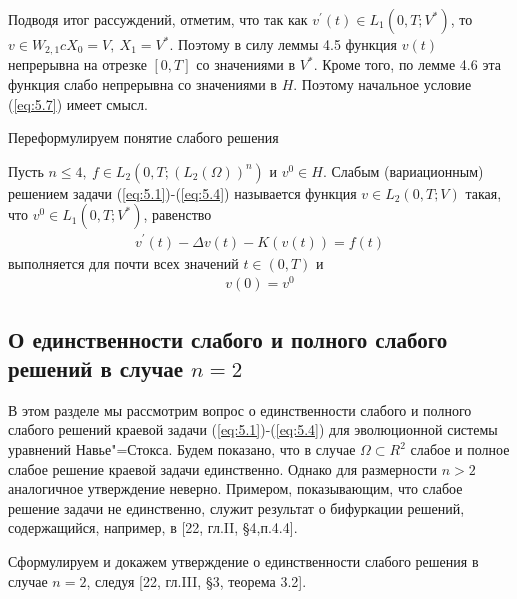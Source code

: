 Подводя итог рассуждений, отметим, что так как $v^\prime(t) \in L_1(0, T; V^\ast)$, то $v \in W_{2, 1} c X_0 = V, \ X_1 = V^\ast$. Поэтому в силу леммы 4.5 функция
$v(t)$ непрерывна на отрезке $[0, T]$ со значениями в $V^\ast$. Кроме того, по лемме 4.6 эта функция слабо непрерывна со значениями в $H$. Поэтому
начальное условие (\ref{eq:5.7}) имеет смысл.

Переформулируем понятие слабого решения
\begin{definition}
    Пусть $n \le 4, \ f \in L_2(0, T; (L_2(\Omega))^n)$ и $v^0 \in H$. Слабым (вариационным) решением задачи (\ref{eq:5.1})-(\ref{eq:5.4}) называется функция
    $v \in L_2(0, T; V)$ такая, что $v^0 \in L_1(0, T; V^\ast)$, равенство
    \begin{equation}\label{eq:5.11}
        \begin{gathered}
            v^\prime(t) - \Delta v(t) - K(v(t)) = f(t)
        \end{gathered}
    \end{equation}
    выполняется для почти всех значений $t \in (0, T)$ и
    \begin{equation}\label{eq:5.12}
        \begin{gathered}
            v(0) = v^0
        \end{gathered}
    \end{equation}
\end{definition}


\subsection {О единственности слабого и полного слабого решений в случае $n = 2$}
В этом разделе мы рассмотрим вопрос о единственности слабого и полного слабого решений краевой задачи (\ref{eq:5.1})-(\ref{eq:5.4}) для эволюционной
системы уравнений Навье"=Стокса. Будем показано, что в случае $\Omega \subset R^2$ слабое и полное слабое решение краевой задачи единственно.
Однако для размерности $n > 2$ аналогичное утверждение неверно. Примером, показывающим, что слабое решение задачи не единственно, служит результат
о бифуркации решений, содержащийся, например, в [22, гл.II, \S 4,п.4.4].

Сформулируем и докажем утверждение о единственности слабого решения в случае $n = 2$, следуя [22, гл.III, \S 3, теорема 3.2].

